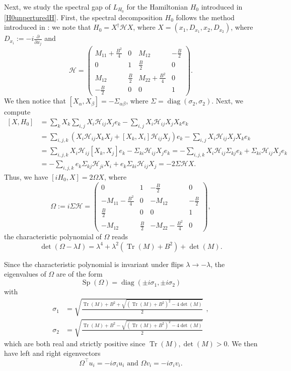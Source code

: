 \documentclass[11pt]{amsart}
\newcommand{\1}{\mathbbm{1}}
\newcommand{\Tr}{\operatorname{Tr}}
\theoremstyle{plain}
\theoremstyle{definition}
\theoremstyle{remark}
\numberwithin{equation}{section}
\begin{document}
\noindent Next, we study the spectral gap of $L_{H_0}$ for the Hamiltonian $H_0$ introduced in \eqref{H0unperturedH}. First, the spectral decomposition $H_0$ follows the method introduced in \cite{lin2002anisotropic}: we note that $H_0 = X^{\dagger} \mathcal H X$, where $X = (x_1,D_{x_1},x_2,D_{x_2})$, where $D_{x_i}:=-i \frac{\partial}{\partial x_j}$ and 
\[ \mathcal H = \begin{pmatrix} M_{11} + \frac{B^2}{4} &0 & M_{12} & -\frac{B}{2}  \\ 0 & 1&  \frac{B}{2} & 0\\  M_{12} &  \frac{B}{2}&  M_{22}+ \frac{B^2}{4} & 0 \\ -\frac{B}{2}& 0& 0& 1 \end{pmatrix}.\]
We then notice that $[X_{\alpha},X_{\beta}]= -\Sigma_{\alpha \beta}$, where $\Sigma = \operatorname{diag}(\sigma_2,\sigma_2).$ Next, we compute 
\[\begin{split} [X,H_0]&=\sum_{k} X_{k} \sum_{i,j} X_i \mathcal H_{ij} X_j e_k- \sum_{i,j} X_i \mathcal H_{ij} X_jX_{k}e_k \\
&= \sum_{i,j,k} (X_i  \mathcal H_{ij}X_{k} X_j +[X_k,X_i] \mathcal H_{ij}X_j)  e_k 
- \sum_{i,j} X_i \mathcal H_{ij} X_jX_{k}e_k \\ 
&= \sum_{i,j,k} X_i  \mathcal H_{ij}[X_{k}, X_j]  e_k -\Sigma_{ki} \mathcal H_{ij}X_j  e_k =- \sum_{i,j,k} X_i  \mathcal H_{ij}\Sigma_{kj}  e_k + \Sigma_{ki} \mathcal H_{ij}X_j  e_k \\
&=- \sum_{i,j,k}   e_k\Sigma_{kj}\mathcal H_{ji}X_i   + e_k\Sigma_{ki} \mathcal H_{ij}X_j = -2\Sigma \mathcal H X.\end{split} \]
Thus, we have $[iH_0,X]=2\Omega X$, where 
\[ \Omega:=i\Sigma \mathcal H=
\begin{pmatrix} 0 & 1 & -\frac{B}{2}& 0\\
 -M_{11}-\frac{B^2}{4} & 0 & -M_{12}& -\frac{B}{2} \\
 \frac{B}{2} & 0 & 0 & 1\\
-M_{12} & \frac{B}{2} & -M_{22}-\frac{B^2}{4} & 0
\end{pmatrix},\]
the characteristic polynomial of $\Omega$ reads
\[ \det(\Omega-\lambda I)=\lambda^4 + \lambda^2 ( \Tr(M) +B^2) + \operatorname{det}(M).\]

\noindent Since the characteristic polynomial is invariant under flips $\lambda \to -\lambda$, the eigenvalues of $\Omega$ are of the form 
\[ \operatorname{Sp}(\Omega) = \operatorname{diag}(\pm i \sigma_1 ,\pm i \sigma_2)\]
with
\[\begin{split}\sigma_1 &= \sqrt{\frac{\Tr(M)+B^2 + \sqrt{(\Tr(M)+B^2)^2-4\det(M)}}{2}} \,~, \\
\sigma_2 &=\sqrt{\frac{\Tr(M)+B^2 - \sqrt{(\Tr(M)+B^2)^2-4\det(M)}}{2}}\end{split}\]
which are both real and strictly positive since $\Tr(M),\det(M)>0.$ We then have left and right eigenvectors 
\[ \Omega^{\top}u_i = -i\sigma_i u_i \text{ and }\Omega v_i = -i\sigma_i v_i .\]
\end{document}
